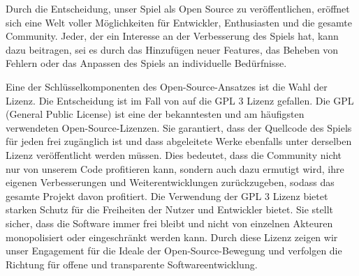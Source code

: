Durch die Entscheidung, unser Spiel als Open Source zu veröffentlichen, eröffnet sich eine Welt voller Möglichkeiten für Entwickler, Enthusiasten und die gesamte Community.
Jeder, der ein Interesse an der Verbesserung des Spiels hat, kann dazu beitragen, sei es durch das Hinzufügen neuer Features, das Beheben von Fehlern oder das Anpassen des Spiels an individuelle Bedürfnisse.

Eine der Schlüsselkomponenten des Open-Source-Ansatzes ist die Wahl der Lizenz.
Die Entscheidung ist im Fall von \ff auf die GPL 3 Lizenz gefallen.
Die GPL (General Public License) ist eine der bekanntesten und am häufigsten verwendeten Open-Source-Lizenzen.
Sie garantiert, dass der Quellcode des Spiels für jeden frei zugänglich ist und dass abgeleitete Werke ebenfalls unter derselben Lizenz veröffentlicht werden müssen.
Dies bedeutet, dass die Community nicht nur von unserem Code profitieren kann, sondern auch dazu ermutigt wird, ihre eigenen Verbesserungen und Weiterentwicklungen zurückzugeben, sodass das gesamte Projekt davon profitiert.
Die Verwendung der GPL 3 Lizenz bietet starken Schutz für die Freiheiten der Nutzer und Entwickler bietet.
Sie stellt sicher, dass die Software immer frei bleibt und nicht von einzelnen Akteuren monopolisiert oder eingeschränkt werden kann.
Durch diese Lizenz zeigen wir unser Engagement für die Ideale der Open-Source-Bewegung und verfolgen die Richtung für offene und transparente Softwareentwicklung.
%
\renewcommand{\kapitelautor}{}
